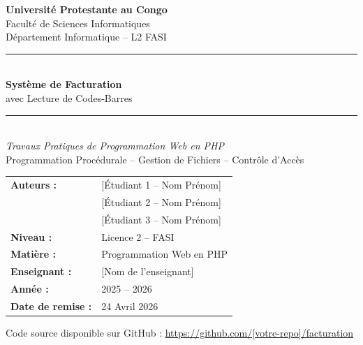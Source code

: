 \documentclass[12pt,a4paper]{report}
\begin{document}
\begin{titlepage}
  \centering
  \vspace*{2cm}

  {\Large\bfseries Université Protestante au Congo}\\[0.4cm]
  {\large Faculté de Sciences Informatiques}\\[0.2cm]
  {\large Département Informatique -- L2 FASI}\\[2cm]

  \rule{\linewidth}{1.5pt}\\[0.5cm]
  {\huge\bfseries\color{darkGray} Système de Facturation}\\[0.4cm]
  {\Large avec Lecture de Codes-Barres}\\[0.3cm]
  \rule{\linewidth}{1.5pt}\\[1.5cm]

  {\large\textit{Travaux Pratiques de Programmation Web en PHP}}\\[0.3cm]
  {\normalsize Programmation Procédurale -- Gestion de Fichiers -- Contrôle d'Accès}\\[2cm]

  \begin{tabular}{ll}
    \textbf{Auteurs :}        & [Étudiant 1 -- Nom Prénom]          \\[0.2cm]
                              & [Étudiant 2 -- Nom Prénom]          \\[0.2cm]
                              & [Étudiant 3 -- Nom Prénom]          \\[0.6cm]
    \textbf{Niveau :}         & Licence 2 -- FASI                   \\[0.2cm]
    \textbf{Matière :}        & Programmation Web en PHP            \\[0.2cm]
    \textbf{Enseignant :}     & [Nom de l'enseignant]               \\[0.2cm]
    \textbf{Année :}          & 2025 -- 2026                        \\[0.2cm]
    \textbf{Date de remise :} & 24 Avril 2026                       \\
  \end{tabular}

  \vfill
  {\small Code source disponible sur GitHub :
  \url{https://github.com/[votre-repo]/facturation}}
\end{titlepage}

\tableofcontents
\newpage
\end{document}
